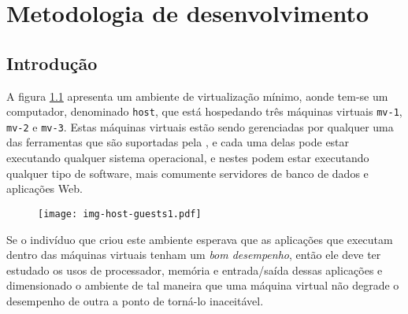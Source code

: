 %
%
%
% 
%
%

\chapter{Metodologia de desenvolvimento}\label{sec:meto}

\section{Introdução}


A figura \ref{fig:hostguests1} apresenta um ambiente de virtualização
mínimo, aonde tem-se um computador, denominado \texttt{host}, que está
hospedando três máquinas virtuais \texttt{mv-1}, \texttt{mv-2} e
\texttt{mv-3}. Estas máquinas virtuais estão sendo gerenciadas por qualquer
uma das ferramentas que são suportadas pela \libvirt{}, e cada uma delas
pode estar executando qualquer sistema operacional, e nestes podem estar
executando qualquer tipo de software, mais comumente servidores de banco de
dados e aplicações Web.

\begin{figure}[htp]
\centering
\texttt{[image: img-host-guests1.pdf]}
\label{fig:hostguests1}
\end{figure}

Se o indivíduo que criou este ambiente esperava que as aplicações que
executam dentro das máquinas virtuais tenham um \emph{bom desempenho},
então ele deve ter estudado os usos de processador, memória e entrada/saída
dessas aplicações e dimensionado o ambiente de tal maneira que uma máquina
virtual não degrade o desempenho de outra a ponto de torná-lo inaceitável.

